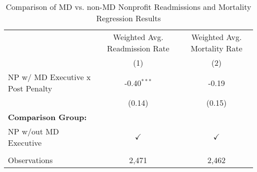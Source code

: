 \begin{table}[htbp]
   \caption{\label{tab:MD_noMD_fullsample} Comparison of MD vs. non-MD Nonprofit Readmissions and Mortality Regression Results}
   \bigskip
   \centering
   \begin{tabular}{lcc}
      \toprule
                                        & Weighted Avg. Readmission Rate & Weighted Avg. Mortality Rate\\  
                                        & (1)                            & (2)\\  
      \midrule 
      NP w/ MD Executive x Post Penalty & -0.40$^{***}$                  & -0.19\\   
                                        & (0.14)                         & (0.15)\\   
      \textbf{Comparison Group:}        &                                & \\  
      NP w/out MD Executive             & $\checkmark$                   & $\checkmark$\\   
       \\
      Observations                      & 2,471                          & 2,462\\  
      \bottomrule
   \end{tabular}
\end{table}